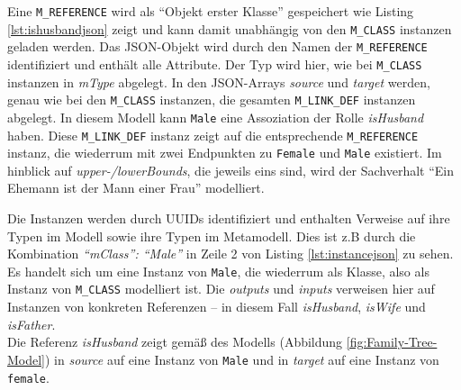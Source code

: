

Eine \texttt{M\_REFERENCE} wird als "`Objekt erster Klasse"' gespeichert wie Listing \ref{lst:ishusbandjson} zeigt und kann damit unabhängig von den \texttt{M\_CLASS} instanzen geladen werden. Das JSON-Objekt wird durch den Namen der \texttt{M\_REFERENCE} identifiziert und enth\"alt alle Attribute. Der Typ wird hier, wie bei \texttt{M\_CLASS} instanzen in \textit{mType} abgelegt. In den JSON-Arrays \textit{source} und \textit{target} werden, genau wie bei den \texttt{M\_CLASS} instanzen, die gesamten \texttt{M\_LINK\_DEF} instanzen abgelegt. In diesem Modell kann \texttt{Male} eine Assoziation der Rolle \textit{isHusband} haben. Diese \texttt{M\_LINK\_DEF} instanz zeigt auf die entsprechende \texttt{M\_REFERENCE} instanz, die wiederrum mit zwei Endpunkten zu \texttt{Female} und \texttt{Male} existiert. Im hinblick auf \textit{upper-/lowerBounds}, die jeweils eins sind, wird der Sachverhalt "`Ein Ehemann ist der Mann einer Frau"' modelliert.



Die Instanzen werden durch UUIDs identifiziert und enthalten Verweise auf ihre Typen im Modell sowie ihre Typen im Metamodell. Dies ist z.B durch die Kombination \textit{"`mClass"': "`Male"'} in Zeile 2 von Listing \ref{lst:instancejson} zu sehen. Es handelt sich um eine Instanz von \texttt{Male}, die wiederrum als Klasse, also als Instanz von \texttt{M\_CLASS} modelliert ist. Die \textit{outputs} und \textit{inputs} verweisen hier auf Instanzen von konkreten Referenzen -- in diesem Fall \textit{isHusband}, \textit{isWife} und \textit{isFather}.\\
Die Referenz \textit{isHusband} zeigt gemäß des Modells (Abbildung \ref{fig:Family-Tree-Model}) in \textit{source} auf eine Instanz von \texttt{Male} und in \textit{target} auf eine Instanz von \texttt{female}.


